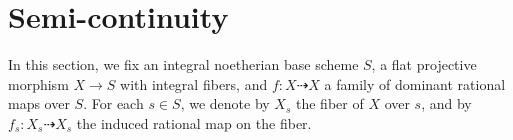 \section{Semi-continuity}

In this section, we fix an integral noetherian base scheme $S$, a flat projective morphism $X \to S$ with integral fibers, and $f: X \dashrightarrow X$ a family of dominant rational maps over $S$.
For each $s \in S$, we denote by $X_s$ the fiber of $X$ over $s$, and by $f_s: X_s \dashrightarrow X_s$ the induced rational map on the fiber.








